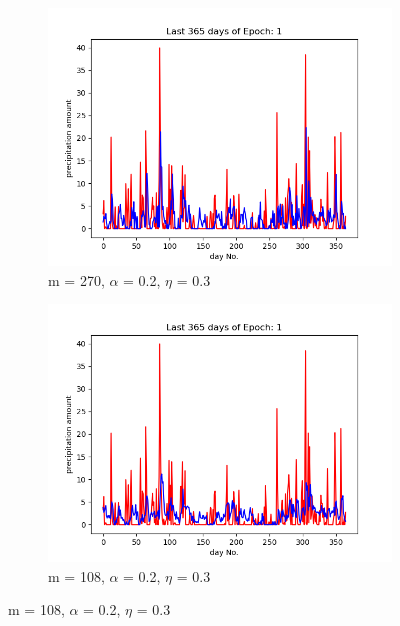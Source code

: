 \documentclass{beamer}
\begin{document}
\begin{frame}
\begin{columns}
    \begin{figure}
        \begin{subfigure}{\textwidth}
            \includegraphics[width=\linewidth]{plots/plot_epoch_1_time_11_20_22.png}
            \caption*{m = 270, $\alpha$ = 0.2, $\eta$ = 0.3}
        \end{subfigure}
        \begin{subfigure}{\textwidth}
            \includegraphics[width=\linewidth]{plots/plot_epoch_1_time_14_14_49.png}
            \caption*{m = 108, $\alpha$ = 0.2, $\eta$ = 0.3}
        \end{subfigure}
    \end{figure}
    \end{columns}

\end{frame}
\end{document}
